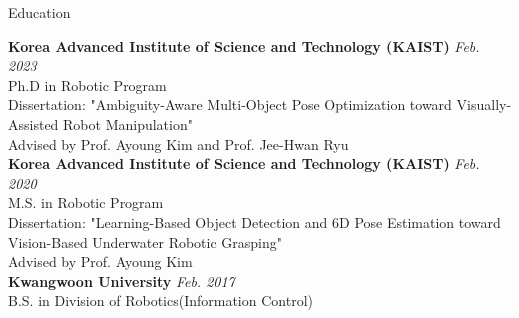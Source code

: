 \begin{rSection}{Education}

{\bf Korea Advanced Institute of Science and Technology (KAIST)} \hfill {\em Feb. 2023} \\
Ph.D in Robotic Program \\
Dissertation: "Ambiguity-Aware Multi-Object Pose Optimization toward Visually-Assisted Robot Manipulation" \\
Advised by Prof. Ayoung Kim and Prof. Jee-Hwan Ryu \\
    

{\bf Korea Advanced Institute of Science and Technology (KAIST)} \hfill {\em Feb. 2020} \\
M.S. in Robotic Program \\
Dissertation: "Learning-Based Object Detection and 6D Pose Estimation toward Vision-Based Underwater Robotic Grasping" \\
Advised by Prof. Ayoung Kim \\

{\bf Kwangwoon University} \hfill {\em Feb. 2017} \\
B.S. in Division of Robotics(Information Control) \\



\vspace{-5mm}

\end{rSection}

